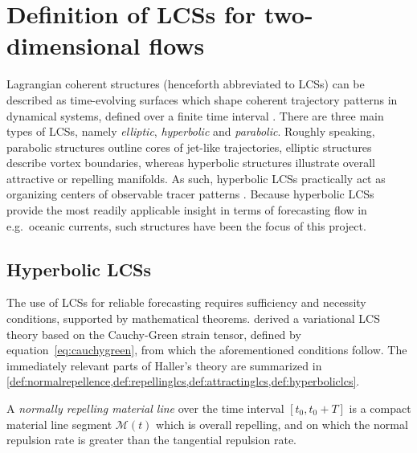 \section{Definition of LCSs for two-dimensional flows}
\label{sec:definition_of_lcss_for_two-dimensional_flow}
Lagrangian coherent structures (henceforth abbreviated to LCSs) can be described
as time-evolving surfaces which shape coherent trajectory patterns in dynamical
systems, defined over a finite time interval \parencite{haller2010variational}.
There are three main types of LCSs, namely \emph{elliptic},
\emph{hyperbolic} and \emph{parabolic}. Roughly speaking, parabolic structures
outline cores of jet-like trajectories, elliptic structures describe vortex
boundaries, whereas hyperbolic structures illustrate overall attractive or
repelling manifolds. As such, hyperbolic LCSs practically act as organizing
centers of observable tracer patterns \parencite{onu2015lcstool}. Because
hyperbolic LCSs provide the most readily applicable insight in terms of
forecasting flow in e.g.\ oceanic currents, such structures have been the focus
of this project.

\subsection{Hyperbolic LCSs}
\label{sub:hyperbolic_lcss}

The use of LCSs for reliable forecasting requires sufficiency and necessity
conditions, supported by mathematical theorems. \textcite{haller2010variational}
derived a variational LCS theory based on the Cauchy-Green strain tensor,
defined by equation~\eqref{eq:cauchygreen}, from which the aforementioned
conditions follow. The immediately relevant parts of Haller's theory
are summarized in
\cref{def:normalrepellence,def:repellinglcs,def:attractinglcs,def:hyperboliclcs}.\\

\begin{defn}
    \label{def:normalrepellence}
    A \emph{normally repelling material line} over the time interval
    $[t_{0},t_{0}+T]$ is a compact material line segment $\mathcal{M}(t)$
    which is overall repelling, and on which the normal repulsion rate
    is greater than the tangential repulsion rate.
\end{defn}

